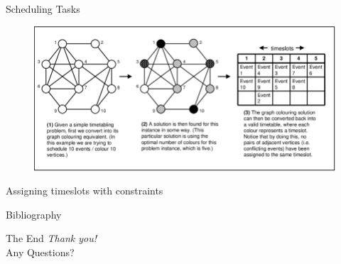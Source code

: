 \documentclass[12pt]{beamer}
\begin{document}
	\begin{frame}{Scheduling Tasks}
		\begin{figure}
			\centering
			\includegraphics[scale=0.3]{diagrams/scheduling.png}
			\label{fig:schedule}
		\end{figure}
		\centering
		Assigning timeslots with constraints \cite{article}
	\end{frame}
	
	{
		\begin{frame}{Bibliography}
			\nocite{*}
			\printbibliography
		\end{frame}
	}
	
	{
		\begin{frame}{The End}
			\centering
			\LARGE
			\textit{Thank you!}\\
			\vspace{10pt}
			\tiny
			Any Questions?
		\end{frame}
	}
	
	
	
\end{document}
